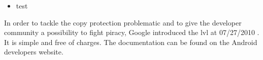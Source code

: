 \begin{itemize}
    \item test
\end{itemize}
In order to tackle the copy protection problematic and to give the developer community a possibility to fight piracy, Google introduced the \gls{lvl} at 07/27/2010 \cite{developersLicensingBlog}.
It is simple and free of charges. The documentation can be found on the Android developers website. \cite{developersLicensingOverview}
